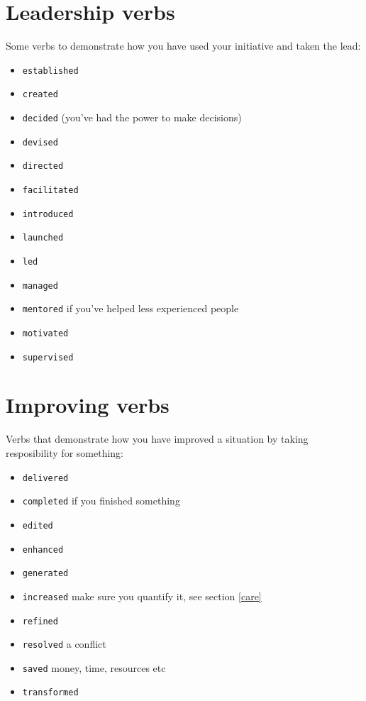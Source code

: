 \documentclass[
]{book}
\providecommand{\tightlist}{%
  \setlength{\itemsep}{0pt}\setlength{\parskip}{0pt}}
\begin{document}
\hypertarget{leading}{%
\section{Leadership verbs}\label{leading}}

Some verbs to demonstrate how you have used your initiative and taken the lead:

\begin{itemize}
\tightlist
\item
  \texttt{established}
\item
  \texttt{created}
\item
  \texttt{decided} (you've had the power to make decisions)
\item
  \texttt{devised}
\item
  \texttt{directed}
\item
  \texttt{facilitated}
\item
  \texttt{introduced}
\item
  \texttt{launched}
\item
  \texttt{led}
\item
  \texttt{managed}
\item
  \texttt{mentored} if you've helped less experienced people
\item
  \texttt{motivated}
\item
  \texttt{supervised}
\end{itemize}

\hypertarget{improving}{%
\section{Improving verbs}\label{improving}}

Verbs that demonstrate how you have improved a situation by taking resposibility for something:

\begin{itemize}
\tightlist
\item
  \texttt{delivered}
\item
  \texttt{completed} if you finished something
\item
  \texttt{edited}
\item
  \texttt{enhanced}
\item
  \texttt{generated}
\item
  \texttt{increased} make sure you quantify it, see section \ref{care}
\item
  \texttt{refined}
\item
  \texttt{resolved} a conflict
\item
  \texttt{saved} money, time, resources etc
\item
  \texttt{transformed}
\end{itemize}
\end{document}
